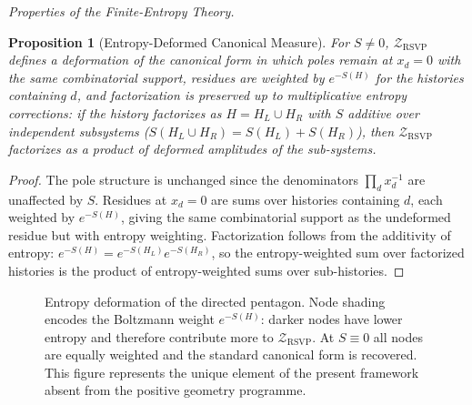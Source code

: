 \documentclass[11pt]{article}
\theoremstyle{plain}
\newtheorem{proposition}[theorem]{Proposition}
\theoremstyle{definition}
\theoremstyle{remark}
\newcommand{\Sf}{S}
\newcommand{\ZRSVP}{\mathcal{Z}_{\mathrm{RSVP}}}
\begin{document}
\medskip\noindent\textit{Properties of the Finite-Entropy Theory.}

\begin{proposition}[Entropy-Deformed Canonical Measure]
For $\Sf \neq 0$, $\ZRSVP$ defines a deformation of the canonical form in which poles remain at $x_d = 0$ with the same combinatorial support, residues are weighted by $e^{-\Sf(H)}$ for the histories containing $d$, and factorization is preserved up to multiplicative entropy corrections: if the history factorizes as $H = H_L \cup H_R$ with $\Sf$ additive over independent subsystems ($\Sf(H_L \cup H_R) = \Sf(H_L) + \Sf(H_R)$), then $\ZRSVP$ factorizes as a product of deformed amplitudes of the sub-systems.
\end{proposition}

\begin{proof}
The pole structure is unchanged since the denominators $\prod_d x_d^{-1}$ are unaffected by $\Sf$. Residues at $x_d = 0$ are sums over histories containing $d$, each weighted by $e^{-\Sf(H)}$, giving the same combinatorial support as the undeformed residue but with entropy weighting. Factorization follows from the additivity of entropy: $e^{-\Sf(H)} = e^{-\Sf(H_L)} e^{-\Sf(H_R)}$, so the entropy-weighted sum over factorized histories is the product of entropy-weighted sums over sub-histories.
\end{proof}


\begin{figure}[H]
\centering
{}
\caption{Entropy deformation of the directed pentagon. Node shading
encodes the Boltzmann weight $e^{-\Sf(H)}$: darker nodes have lower
entropy and therefore contribute more to $\ZRSVP$. At $\Sf\equiv 0$
all nodes are equally weighted and the standard canonical form is
recovered. This figure represents the unique element of the present
framework absent from the positive geometry programme.}
\end{figure}
\end{document}
